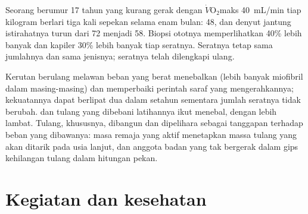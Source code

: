 \begin{example}\label{ex:g10:sport-and-health:numbers}
Seorang berumur 17 tahun yang kurang gerak dengan
$\dot V\!\mathrm{O_2}$maks \qty{40}{mL/min} tiap kilogram berlari tiga
kali sepekan selama enam bulan: \num{48}, dan denyut jantung
istirahatnya turun dari 72 menjadi 58. Biopsi ototnya memperlihatkan
 40\% lebih banyak dan kapiler 30\% lebih banyak tiap
seratnya. Seratnya tetap sama jumlahnya dan sama jenisnya; seratnya
telah dilengkapi ulang.
\end{example}

\begin{proposition}\label{prop:g10:sport-and-health:strength}
Kerutan berulang melawan beban yang berat menebalkan 
(lebih banyak miofibril dalam masing-masing) dan memperbaiki perintah
saraf yang mengerahkannya; kekuatannya dapat berlipat dua dalam setahun
sementara jumlah seratnya tidak berubah.  dan tulang yang
dibebani latihannya ikut menebal, dengan lebih lambat. Tulang,
khususnya, dibangun dan dipelihara sebagai tanggapan terhadap beban
yang dibawanya: masa remaja yang aktif menetapkan massa tulang yang
akan ditarik pada usia lanjut, dan anggota badan yang tak bergerak
dalam gips kehilangan tulang dalam hitungan pekan.
\end{proposition}
\admitted

\section{Kegiatan dan kesehatan}


